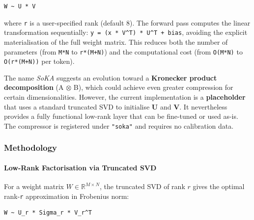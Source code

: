 \vspace{0.5em}
\begin{mdframed}[backgroundcolor=codebg, linecolor=codeframe, linewidth=1pt, roundcorner=4pt, innerleftmargin=2pt, innerrightmargin=5pt, innertopmargin=5pt, innerbottommargin=5pt]
\begin{lstlisting}
W ~ U * V
\end{lstlisting}
\end{mdframed}
\vspace{0.5em}

where \texttt{r} is a user-specified rank (default 8). The forward pass computes the linear transformation sequentially: \texttt{y = (x * V\textasciicircum{}T) * U\textasciicircum{}T + bias}, avoiding the explicit materialisation of the full weight matrix. This reduces both the number of parameters (from \texttt{M*N} to \texttt{r*(M+N)}) and the computational cost (from \texttt{O(M*N)} to \texttt{O(r*(M+N))} per token).

The name \textit{SoKA} suggests an evolution toward a \textbf{Kronecker product decomposition} (A $\otimes$ B), which could achieve even greater compression for certain dimensionalities. However, the current implementation is a \textbf{placeholder} that uses a standard truncated SVD to initialise \textbf{U} and \textbf{V}. It nevertheless provides a fully functional low-rank layer that can be fine-tuned or used as-is. The compressor is registered under \texttt{"soka"} and requires no calibration data.


\subsubsection*{Methodology}

\paragraph{Low-Rank Factorisation via Truncated SVD}

For a weight matrix $W \in \mathbb{R}^{M \times N}$, the truncated SVD of rank $r$ gives the optimal rank-\texttt{r} approximation in Frobenius norm:

\vspace{0.5em}
\begin{mdframed}[backgroundcolor=codebg, linecolor=codeframe, linewidth=1pt, roundcorner=4pt, innerleftmargin=2pt, innerrightmargin=5pt, innertopmargin=5pt, innerbottommargin=5pt]
\begin{lstlisting}
W ~ U_r * Sigma_r * V_r^T
\end{lstlisting}
\end{mdframed}
\vspace{0.5em}


